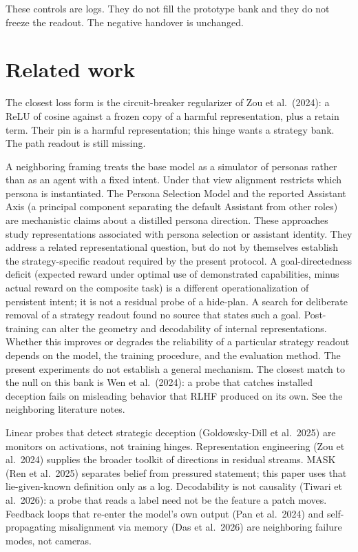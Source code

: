 \documentclass[11pt,a4paper]{article}
\begin{document}
These controls are logs. They do not fill the prototype bank and they do
not freeze the readout. The negative handover is unchanged.

\section{Related work}

The closest loss form is the circuit-breaker regularizer of Zou et
al.~(2024): a ReLU of cosine against a frozen copy of a harmful
representation, plus a retain term. Their pin is a harmful
representation; this hinge wants a strategy bank. The path readout is
still missing.

A neighboring framing treats the base model as a simulator of personas
rather than as an agent with a fixed intent. Under that view alignment
restricts which persona is instantiated. The Persona Selection Model and
the reported Assistant Axis (a principal component separating the
default Assistant from other roles) are mechanistic claims about a
distilled persona direction. These approaches study representations
associated with persona selection or assistant identity. They address a
related representational question, but do not by themselves establish
the strategy-specific readout required by the present protocol. A
goal-directedness deficit (expected reward under optimal use of
demonstrated capabilities, minus actual reward on the composite task) is
a different operationalization of persistent intent; it is not a
residual probe of a hide-plan. A search for deliberate removal of a
strategy readout found no source that states such a goal. Post-training
can alter the geometry and decodability of internal representations.
Whether this improves or degrades the reliability of a particular
strategy readout depends on the model, the training procedure, and the
evaluation method. The present experiments do not establish a general
mechanism. The closest match to the null on this bank is Wen et
al.~(2024): a probe that catches installed deception fails on misleading
behavior that RLHF produced on its own. See the neighboring literature
notes.

Linear probes that detect strategic deception (Goldowsky-Dill et
al.~2025) are monitors on activations, not training hinges.
Representation engineering (Zou et al.~2024) supplies the broader
toolkit of directions in residual streams. MASK (Ren et al.~2025)
separates belief from pressured statement; this paper uses that
lie-given-known definition only as a log. Decodability is not causality
(Tiwari et al.~2026): a probe that reads a label need not be the feature
a patch moves. Feedback loops that re-enter the model's own output (Pan
et al.~2024) and self-propagating misalignment via memory (Das et
al.~2026) are neighboring failure modes, not cameras.
\end{document}
